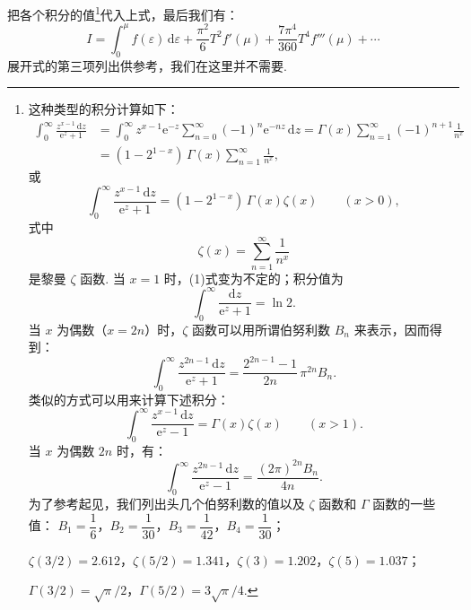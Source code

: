 把各个积分的值\footnote{这种类型的积分计算如下：
\begin{equation*}
\begin{aligned}
  \int_0^\infty\frac{z^{x-1}\,\mathrm{d}z}{\mathrm{e}^z+1}
  &=\int_0^\infty z^{x-1}\mathrm{e}^{-z}\sum_{n=0}^\infty(-1)^n\mathrm{e}^{-nz}\,\mathrm{d}z
  =\Gamma(x)\sum_{n=1}^\infty(-1)^{n+1}\frac{1}{n^x}\\
  &=(1-2^{1-x})\,\Gamma(x)\sum_{n=1}^\infty\frac{1}{n^x},
\end{aligned}
\end{equation*}
或
\begin{equation*}
  \int_0^\infty\frac{z^{x-1}\,\mathrm{d}z}{\mathrm{e}^z+1}
  =(1-2^{1-x})\,\Gamma(x)\zeta(x)\qquad(x>0),
\tag{1}
\end{equation*}
式中
\begin{equation*}
  \zeta(x)=\sum_{n=1}^\infty\frac{1}{n^x}
\end{equation*}
是黎曼 $\zeta$ 函数.
当 $x=1$ 时，(1)式变为不定的；积分值为
\begin{equation*}
  \int_0^\infty\frac{\mathrm{d}z}{\mathrm{e}^z+1}=\ln 2.
\tag{2}
\end{equation*}
当 $x$ 为偶数（$x=2n$）时，$\zeta$ 函数可以用所谓伯努利数 $B_n$ 来表示，因而得到：
\begin{equation*}
  \int_0^\infty\frac{z^{2n-1}\,\mathrm{d}z}{\mathrm{e}^z+1}
  =\frac{2^{2n-1}-1}{2n}\,\pi^{2n}B_n.
\tag{3}
\end{equation*}
类似的方式可以用来计算下述积分：
\begin{equation*}
  \int_0^\infty\frac{z^{x-1}\,\mathrm{d}z}{\mathrm{e}^z-1}
  =\Gamma(x)\zeta(x)\qquad(x>1).
\tag{4}
\end{equation*}
当 $x$ 为偶数 $2n$ 时，有：
\begin{equation*}
  \int_0^\infty\frac{z^{2n-1}\,\mathrm{d}z}{\mathrm{e}^z-1}
  =\frac{(2\pi)^{2n}B_n}{4n}.
\tag{5}
\end{equation*}
为了参考起见，我们列出头几个伯努利数的值以及 $\zeta$ 函数和 $\Gamma$ 函数的一些值：
$B_1=\dfrac{1}{6}$，\quad$B_2=\dfrac{1}{30}$，\quad$B_3=\dfrac{1}{42}$，\quad$B_4=\dfrac{1}{30}$；

$\zeta(3/2)=2.612$，\quad$\zeta(5/2)=1.341$，\quad$\zeta(3)=1.202$，\quad$\zeta(5)=1.037$；

$\Gamma(3/2)=\sqrt{\pi}/2$，\quad$\Gamma(5/2)=3\sqrt{\pi}/4$.}代入上式，最后我们有：
\begin{equation}
  I=\int_0^{\mu}f(\varepsilon)\,\mathrm{d}\varepsilon
  +\frac{\pi^2}{6}T^2f'(\mu)+\frac{7\pi^4}{360}T^4f'''(\mu)+\cdots
\end{equation}
展开式的第三项列出供参考，我们在这里并不需要.

